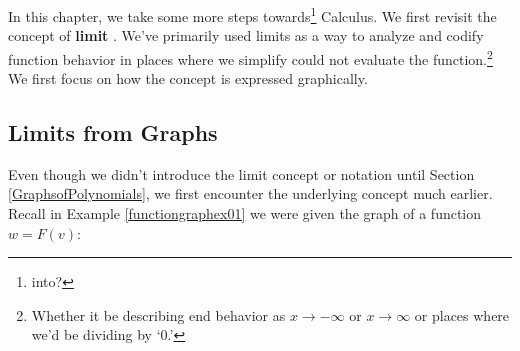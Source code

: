 \documentclass{ximera}
\begin{document}
	\author{Stitz-Zeager}




\setcounter{footnote}{0}

\label{IntroLimits}

In this chapter, we take some more steps towards\footnote{into?} Calculus.  We first revisit the  concept of \textbf{limit} .  We've primarily used limits as a way to analyze and codify function behavior in places where we simplify could not evaluate the function.\footnote{Whether it be describing end behavior as $x \rightarrow  - \infty$  or $x \rightarrow  \infty$ or places where we'd be dividing by `$0$.'}  We first focus on how the concept is expressed graphically.

\subsection{Limits from Graphs}
\label{limitsfromgraphs}

Even though we didn't introduce the limit concept or notation until Section \ref{GraphsofPolynomials}, we first encounter the underlying concept much earlier.  Recall in  Example \ref{functiongraphex01} we were given the graph of a function $w = F(v)$:
\end{document}
